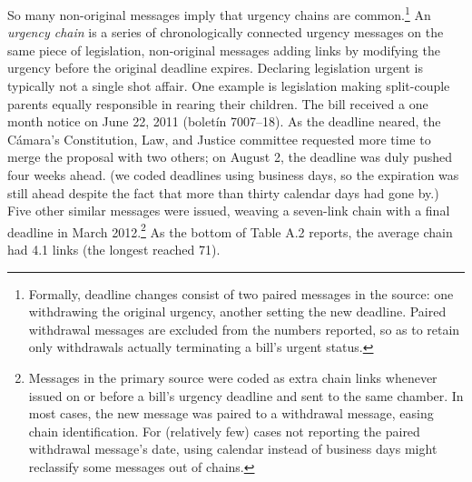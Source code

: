 \documentclass[letter,12pt]{article}
\begin{document}
So many non-original messages imply that urgency chains are common.\footnote{Formally, deadline changes consist of two paired messages in the source: one withdrawing the original urgency, another setting the new deadline. Paired withdrawal messages are excluded from the numbers reported, so as to retain only withdrawals actually terminating a bill's urgent status.} An \emph{urgency chain} is a series of chronologically connected urgency messages on the same piece of legislation, non-original messages adding links by modifying the urgency before the original deadline expires. Declaring legislation urgent is typically not a single shot affair. One example is legislation making split-couple parents equally responsible in rearing their children. The bill received a one month notice on June 22, 2011 (bolet\'in 7007--18). As the deadline neared, the C\'amara's Constitution, Law, and Justice committee requested more time to merge the proposal with two others; on August 2, the deadline was duly pushed four weeks ahead. (we coded deadlines using business days, so the expiration was still ahead despite the fact that more than thirty calendar days had gone by.) Five other similar messages were issued, weaving a seven-link chain with a final deadline in March 2012.\footnote{Messages in the primary source were coded as extra chain links whenever issued on or before a bill's urgency deadline and sent to the same chamber. In most cases, the new message was paired to a withdrawal message, easing chain identification. For (relatively few) cases not reporting the paired withdrawal message's date, using calendar instead of business days might reclassify some messages out of chains.} As the bottom of Table A.2 reports, the average chain had 4.1 links (the longest reached 71). 
\end{document}
